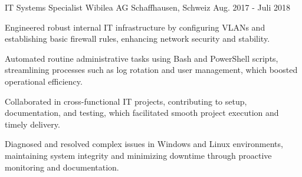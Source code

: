 \begin{cventries}
\cventry
  {IT Systems Specialist}
  {Wibilea AG}
  {Schaffhausen, Schweiz}
  {Aug. 2017 - Juli 2018}
  {
    \begin{cvitems}
\item {Engineered robust internal IT infrastructure by configuring VLANs and establishing basic firewall rules, enhancing network security and stability.}
\item {Automated routine administrative tasks using Bash and PowerShell scripts, streamlining processes such as log rotation and user management, which boosted operational efficiency.}
\item {Collaborated in cross-functional IT projects, contributing to setup, documentation, and testing, which facilitated smooth project execution and timely delivery.}
\item {Diagnosed and resolved complex issues in Windows and Linux environments, maintaining system integrity and minimizing downtime through proactive monitoring and documentation.}
\end{cvitems}
  }
\end{cventries}
